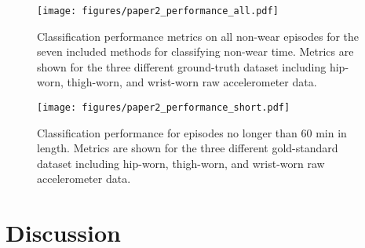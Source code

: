 \documentclass[
  9pt,
]{scrbook}
\begin{document}
\begin{figure}

{\centering \texttt{[image: figures/paper2\_performance\_all.pdf]}

}

\caption{\label{fig-paper2_performance_all}Classification performance
metrics on all non-wear episodes for the seven included methods for
classifying non-wear time. Metrics are shown for the three different
ground-truth dataset including hip-worn, thigh-worn, and wrist-worn raw
accelerometer data.}

\end{figure}

\begin{figure}

{\centering \texttt{[image: figures/paper2\_performance\_short.pdf]}

}

\caption{\label{fig-paper2_performance_short}Classification performance
for episodes no longer than 60 min in length. Metrics are shown for the
three different gold-standard dataset including hip-worn, thigh-worn,
and wrist-worn raw accelerometer data.}

\end{figure}

\hypertarget{discussion-1}{%
\section{Discussion}\label{discussion-1}}
\end{document}
